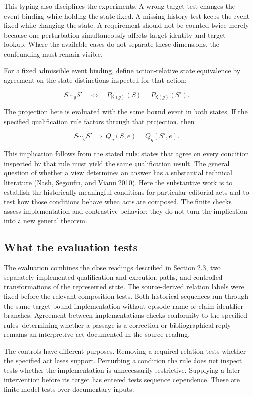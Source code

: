 \documentclass[11pt,a4paper]{article}
\newcommand{\Kappa}{\mathsf{K}}
\begin{document}
This typing also disciplines the experiments. A wrong-target test changes the event binding while holding the state fixed. A missing-history test keeps the event fixed while changing the state. A requirement should not be counted twice merely because one perturbation simultaneously affects target identity and target lookup. Where the available cases do not separate these dimensions, the confounding must remain visible.


For a fixed admissible event binding, define action-relative state equivalence by agreement on the state distinctions inspected for that action:


\[
S\sim_g S'
\quad\Longleftrightarrow\quad
P_{\Kappa(g)}(S)=P_{\Kappa(g)}(S').
\]

The projection here is evaluated with the same bound event in both states. If the specified qualification rule factors through that projection, then


\[
S\sim_g S'\ \Longrightarrow\ Q_g(S,e)=Q_g(S',e).
\]

This implication follows from the stated rule: states that agree on every condition inspected by that rule must yield the same qualification result. The general question of whether a view determines an answer has a substantial technical literature (Nash, Segoufin, and Vianu 2010). Here the substantive work is to establish the historically meaningful conditions for particular editorial acts and to test how those conditions behave when acts are composed. The finite checks assess implementation and contrastive behavior; they do not turn the implication into a new general theorem.


\subsection{What the evaluation tests}

The evaluation combines the close readings described in Section 2.3, two separately implemented qualification-and-execution paths, and controlled transformations of the represented state. The source-derived relation labels were fixed before the relevant composition tests. Both historical sequences run through the same target-bound implementation without episode-name or claim-identifier branches. Agreement between implementations checks conformity to the specified rules; determining whether a passage is a correction or bibliographical reply remains an interpretive act documented in the source reading.


The controls have different purposes. Removing a required relation tests whether the specified act loses support. Perturbing a condition the rule does not inspect tests whether the implementation is unnecessarily restrictive. Supplying a later intervention before its target has entered tests sequence dependence. These are finite model tests over documentary inputs.
\end{document}
